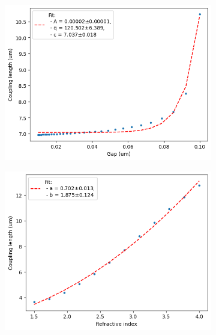 \begin{figure}[H]
    \centering
    \begin{subfigure}[b]{0.45\linewidth}
        \centering
        \includegraphics[width=\linewidth]{Figures/wg_coupling_vs_gap.png}
        \caption{}
        \label{fig:wg_coupling_vs_gap}
    \end{subfigure}
    \hfill
    \begin{subfigure}[b]{0.45\linewidth}
        \centering
        \includegraphics[width=\linewidth]{Figures/wg_coupling_vs_index.png}
        \caption{}
        \label{fig:wg_coupling_vs_index}
    \end{subfigure}
\end{figure}

